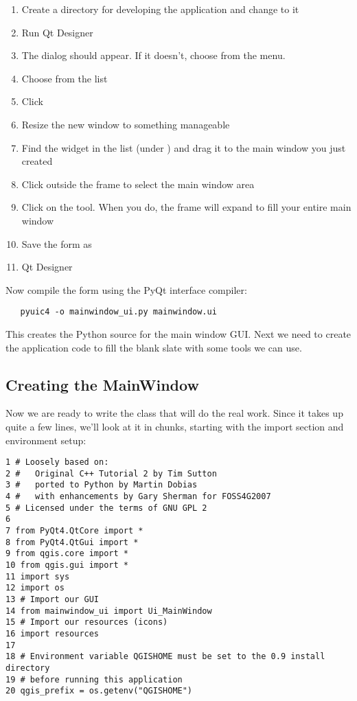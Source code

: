 \begin{enumerate}
\item Create a directory for developing the application and change to it
\item Run Qt Designer
\item The  dialog should appear. If it doesn't, choose
 from the  menu.
\item Choose  from 
the  list
\item Click  
\item Resize the new window to something manageable
\item Find the  widget in the list 
(under ) and drag it to
the main window you just created
\item Click outside the frame to select the main window area 
\item Click on the  tool. When you do, the frame
will expand to fill your entire main window
\item Save the form as  
\item {} Qt Designer
\end{enumerate} 

Now compile the form using the PyQt interface compiler:

\begin{verbatim}
   pyuic4 -o mainwindow_ui.py mainwindow.ui
\end{verbatim}

This creates the Python source for the main window GUI. Next we need to create
the application code to fill the blank slate with some tools we can use.

\subsection{Creating the MainWindow}

Now we are ready to write the  class that will do the real work.
Since it takes up quite a few lines, we'll look at it in chunks, starting
with the import section and environment setup:

\begin{verbatim}
1 # Loosely based on:
2 #   Original C++ Tutorial 2 by Tim Sutton
3 #   ported to Python by Martin Dobias
4 #   with enhancements by Gary Sherman for FOSS4G2007
5 # Licensed under the terms of GNU GPL 2
6
7 from PyQt4.QtCore import *
8 from PyQt4.QtGui import *
9 from qgis.core import *
10 from qgis.gui import *
11 import sys
12 import os
13 # Import our GUI
14 from mainwindow_ui import Ui_MainWindow
15 # Import our resources (icons)
16 import resources
17 
18 # Environment variable QGISHOME must be set to the 0.9 install directory
19 # before running this application
20 qgis_prefix = os.getenv("QGISHOME")
\end{verbatim}

